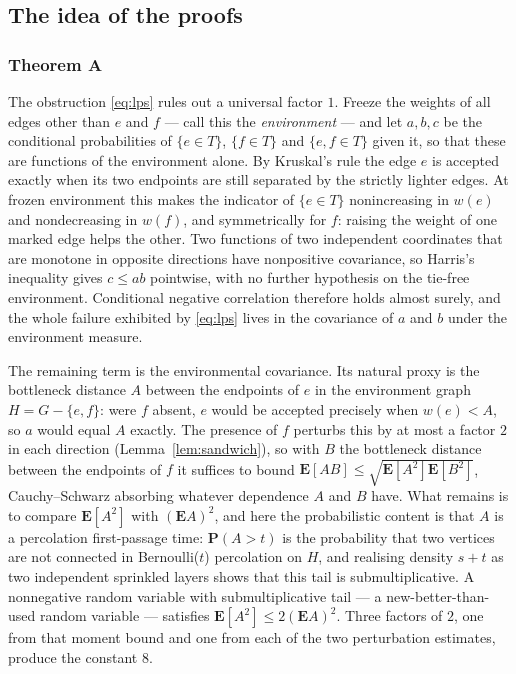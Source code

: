 \documentclass[11pt,a4paper]{amsart}
\theoremstyle{plain}
\theoremstyle{definition}
\theoremstyle{remark}
\newcommand{\E}{\mathbf{E}}
\newcommand{\PP}{\mathbf{P}}
\begin{document}
\subsection{The idea of the proofs}
\label{ssec:idea}

\subsubsection*{Theorem A}
The obstruction \eqref{eq:lps} rules out a universal factor $1$. Freeze
the weights of all edges other than $e$ and $f$ --- call this the
\emph{environment} --- and let $a,b,c$ be the conditional probabilities of
$\{e\in T\}$, $\{f\in T\}$ and $\{e,f\in T\}$ given it, so that these are
functions of the environment alone. By Kruskal's rule the edge $e$ is accepted
exactly when its two endpoints are still separated by the strictly lighter
edges. At frozen environment this makes the indicator of $\{e\in T\}$
nonincreasing in $w(e)$ and nondecreasing in $w(f)$, and symmetrically for $f$:
raising the weight of one marked edge helps the other. Two functions of two
independent coordinates that are monotone in opposite directions have
nonpositive covariance, so Harris's inequality gives $c\le ab$ pointwise, with
no further hypothesis on the tie-free environment. Conditional negative
correlation therefore holds almost surely, and the whole failure exhibited by \eqref{eq:lps}
lives in the covariance of $a$ and $b$ under the environment measure.

The remaining term is the environmental covariance. Its natural proxy is the
bottleneck distance $A$ between the endpoints of $e$ in the environment graph
$H=G-\{e,f\}$: were $f$ absent, $e$ would be accepted precisely when $w(e)<A$,
so $a$ would equal $A$ exactly. The presence of $f$ perturbs this by at most a
factor $2$ in each direction (Lemma~\ref{lem:sandwich}), so with $B$ the
bottleneck distance between the endpoints of $f$ it suffices to bound
$\E[AB]\le\sqrt{\E[A^2]\E[B^2]}$, Cauchy--Schwarz absorbing whatever dependence
$A$ and $B$ have. What remains is to compare $\E[A^2]$ with $(\E A)^2$, and here
the probabilistic content is that $A$ is a percolation first-passage time:
$\PP(A>t)$ is the probability that two vertices are not connected in
Bernoulli($t$) percolation on $H$, and realising density $s+t$ as two
independent sprinkled layers shows that this tail is submultiplicative. A
nonnegative random variable with submultiplicative tail --- a
new-better-than-used random variable --- satisfies $\E[A^2]\le2(\E A)^2$. Three factors of $2$, one
from that moment bound and one from each of the two perturbation estimates,
produce the constant $8$.
\end{document}
